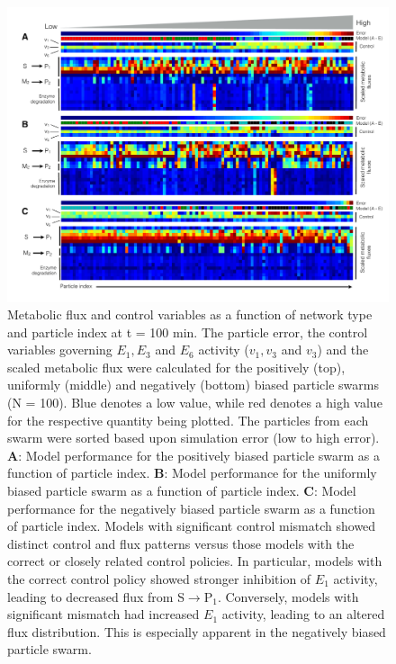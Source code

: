 \documentclass[12pt]{article}
\begin{document}
\clearpage

\begin{figure}
\centering
\includegraphics[width=1.0\textwidth,height=0.6\textheight]{./figs/Figure-8-Flux.pdf}
\caption{Metabolic flux and control variables as a function of network type and particle index at t = 100 min.
The particle error, the control variables governing $E_{1},E_{3}$ and $E_{6}$ activity ($v_{1},v_{3}$ and $v_{3}$) and the scaled metabolic flux were calculated for the positively (top), 
uniformly (middle) and negatively (bottom) biased particle swarms (N = 100). 
Blue denotes a low value, while red denotes a high value for the respective quantity being plotted.
The particles from each swarm were sorted based upon simulation error (low to high error). 
\textbf{A}: Model performance for the positively biased particle swarm as a function of particle index.
\textbf{B}: Model performance for the uniformly biased particle swarm as a function of particle index.
\textbf{C}: Model performance for the negatively biased particle swarm as a function of particle index. 
Models with significant control mismatch showed distinct control and flux patterns versus those models with the correct or closely related control policies.
In particular, models with the correct control policy showed stronger inhibition of $E_{1}$ activity, leading to decreased flux from S$\rightarrow$P$_{1}$.
Conversely, models with significant mismatch had increased $E_{1}$ activity, leading to an altered flux distribution. 
This is especially apparent in the negatively biased particle swarm. 
}\label{fig-flux-pattern}
\end{figure}

\clearpage

\renewcommand\thefigure{S\arabic{figure}}
\renewcommand\thetable{T\arabic{table}}
\renewcommand\thepage{S-\arabic{page}}
\renewcommand\theequation{S\arabic{equation}}

\setcounter{equation}{0}
\setcounter{table}{0}
\setcounter{figure}{0}
\setcounter{page}{1}
\end{document}
